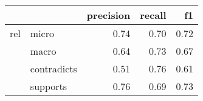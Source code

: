 \begin{tabular}{llrrr}
\toprule
    &          &  precision &  recall &   f1 \\
\midrule
rel & micro &       0.74 &    0.70 & 0.72 \\
    & macro &       0.64 &    0.73 & 0.67 \\
    & contradicts &       0.51 &    0.76 & 0.61 \\
    & supports &       0.76 &    0.69 & 0.73 \\
\bottomrule
\end{tabular}
